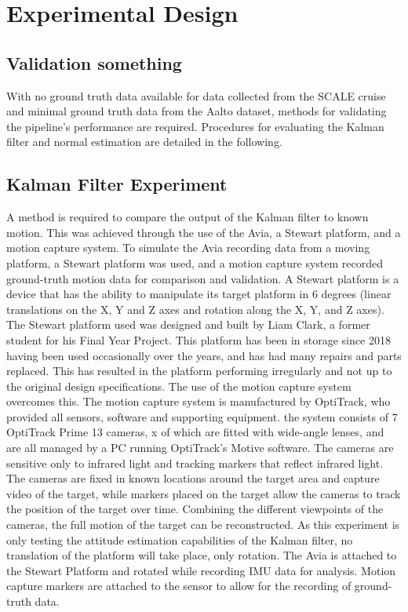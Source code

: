 \chapter{Experimental Design}
\label{ch:ch6}
\section{Validation something}
\label{sec:ch6.section1}

With no ground truth data available for data collected from the SCALE cruise and minimal ground truth data from the Aalto dataset, methods for validating the pipeline's performance are required. Procedures for evaluating the Kalman filter and normal estimation are detailed in the following.

\section{Kalman Filter Experiment}
\label{sec:ch6.section2}

A method is required to compare the output of the Kalman filter to known motion. This was achieved through the use of the Avia, a Stewart platform, and a motion capture system. To simulate the Avia recording data from a moving platform, a Stewart platform was used, and a motion capture system recorded ground-truth motion data for comparison and validation. A Stewart platform is a device that has the ability to manipulate its target platform in 6 degrees (linear translations on the X, Y and Z axes and rotation along the X, Y, and Z axes). The Stewart platform used was designed and built by Liam Clark, a former student for his Final Year Project. This platform has been in storage since 2018 having been used occasionally over the years, and has had many repairs and parts replaced. This has resulted in the platform performing irregularly and not up to the original design specifications. The use of the motion capture system overcomes this.
The motion capture system is manufactured by OptiTrack, who provided all sensors, software and supporting equipment. the system consists of 7 OptiTrack Prime 13 cameras, x of which are fitted with wide-angle lenses, and are all managed by a PC running OptiTrack's Motive software. The cameras are sensitive only to infrared light and tracking markers that reflect infrared light. The cameras are fixed in known locations around the target area and capture video of the target, while markers placed on the target allow the cameras to track the position of the target over time. Combining the different viewpoints of the cameras, the full motion of the target can be reconstructed.
As this experiment is only testing the attitude estimation capabilities of the Kalman filter, no translation of the platform will take place, only rotation. The Avia is attached to the Stewart Platform and rotated while recording IMU data for analysis. Motion capture markers are attached to the sensor to allow for the recording of ground-truth data.

